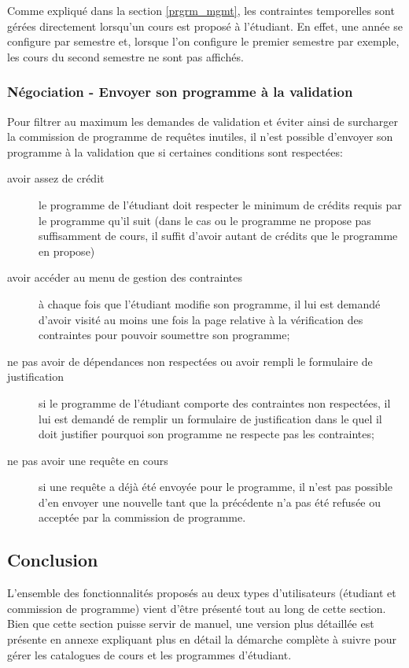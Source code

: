 Comme expliqué dans la section \ref{prgrm_mgmt}, les contraintes temporelles sont gérées directement lorsqu'un cours est proposé à l'étudiant. En effet, une année se configure par semestre et, lorsque l'on configure le premier semestre par exemple, les cours du second semestre ne sont pas affichés. 

\subsubsection{Négociation - Envoyer son programme à la validation}
 \label{validation_request}
Pour filtrer au maximum les demandes de validation et éviter ainsi de surcharger la commission de programme de requêtes inutiles, il n'est possible d'envoyer son programme à la validation que si certaines conditions sont respectées:
\begin{description}
  \item[avoir assez de crédit] le programme de l'étudiant doit respecter le minimum de crédits requis par le programme qu'il suit (dans le cas ou le programme ne propose pas suffisamment de cours, il suffit d'avoir autant de crédits que le programme en propose)
  \item[avoir accéder au menu de gestion des contraintes] à chaque fois que l'étudiant modifie son programme, il lui est demandé d'avoir visité au moins une fois la page relative à la vérification des contraintes pour pouvoir soumettre son programme;
  \item[ne pas avoir de dépendances non respectées ou avoir rempli le formulaire de justification] si le programme de l'étudiant comporte des contraintes non respectées, il lui est demandé de remplir un formulaire de justification dans le quel il doit justifier pourquoi son programme ne respecte pas les contraintes;
  \item[ne pas avoir une requête en cours] si une requête a déjà été envoyée pour le programme, il n'est pas possible d'en envoyer une nouvelle tant que la précédente n'a pas été refusée ou acceptée par la commission de programme.
\end{description} 

\subsection{Conclusion}
L'ensemble des fonctionnalités proposés au deux types d'utilisateurs (étudiant et commission de programme) vient d'être présenté tout au long de cette section. Bien que cette section puisse servir de manuel, une version plus détaillée est présente en annexe expliquant plus en détail la démarche complète à suivre pour gérer les catalogues de cours et les programmes d'étudiant.


